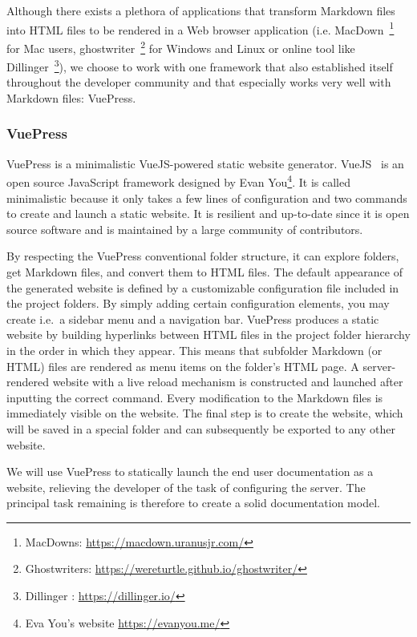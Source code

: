 Although there exists a plethora of applications that transform Markdown files into HTML files to be rendered in a Web browser application (i.e. MacDown~\footnote[1]{MacDowns: \url{https://macdown.uranusjr.com/}} for Mac users, ghostwriter~\footnote[2]{Ghostwriters: \url{https://wereturtle.github.io/ghostwriter/}} for Windows and Linux or online tool like Dillinger~\footnote[3]{Dillinger : \url{https://dillinger.io/}}), we choose to work with one framework that also established itself throughout the developer community and that especially works very well with Markdown files: VuePress.

\subsubsection{VuePress}\label{sec:VP}

VuePress is a minimalistic VueJS-powered static website generator. VueJS~\cite{vuepress} is an open source JavaScript framework designed by Evan You\footnote[4]{Eva You's website \url{https://evanyou.me/}}. It is called minimalistic because it only takes a few lines of configuration and two commands to create and launch a static website. It is resilient and up-to-date since it is open source software and is maintained by a large community of contributors.

By respecting the VuePress conventional folder structure, it can explore folders, get Markdown files, and convert them to HTML files. The default appearance of the generated website is defined by a customizable configuration file included in the project folders. By simply adding certain configuration elements, you may create i.e.~a sidebar menu and a navigation bar. VuePress produces a static website by building hyperlinks between HTML files in the project folder hierarchy in the order in which they appear. This means that subfolder Markdown (or HTML) files are rendered as menu items on the folder's HTML page. A server-rendered website with a live reload mechanism is constructed and launched after inputting the correct command. Every modification to the Markdown files is immediately visible on the website. The final step is to create the website, which will be saved in a special folder and can subsequently be exported to any other website.

We will use VuePress to statically launch the end user documentation as a website, relieving the developer of the task of configuring the server. The principal task remaining is therefore to create a solid documentation model.


